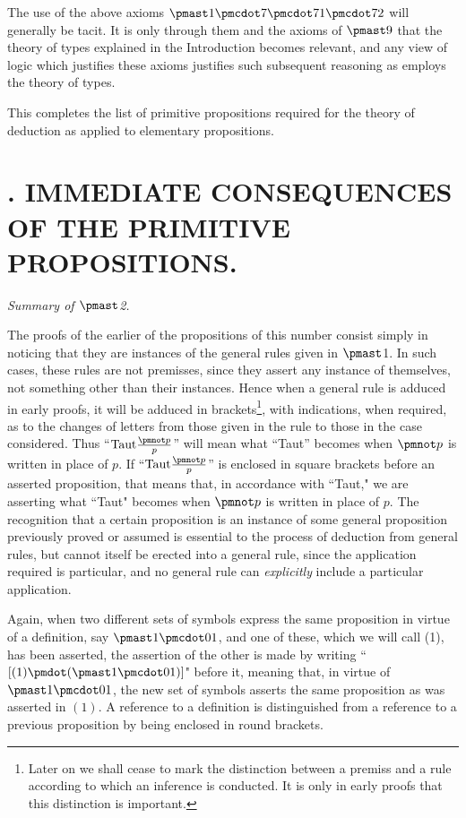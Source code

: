 \documentclass[letterpaper,12pt,openany,leqno]{book}
\newcommand{\pagefirst}[1]{\marginnote[\boxed{\text{#1}}]{\boxed{\text{#1}}}}
\begin{document}
The use of the above axioms $\pmast1\pmcdot7\pmcdot71\pmcdot72$ will generally be tacit. It is only through them and the axioms of $\pmast9$ that the theory of types explained in the Introduction becomes relevant, and any view of logic which justifies these axioms justifies such subsequent reasoning as employs the theory of types.

This completes the list of primitive propositions required for the theory of deduction as applied to elementary propositions.

\chapter*{\centering {}. IMMEDIATE CONSEQUENCES OF THE PRIMITIVE PROPOSITIONS.}  \pagefirst{102} \noindent
\indent \textit{Summary of $\pmast$2.}

The proofs of the earlier of the propositions of this number consist simply in noticing that they are instances of the general rules given in $\pmast$1. In such cases, these rules are not premisses, since they assert any instance of themselves, not something other than their instances. Hence when a general rule is adduced in early proofs, it will be adduced in brackets\footnote{Later on we shall cease to mark the distinction between a premiss and a rule according to which an inference is conducted. It is only in early proofs that this distinction is important.}, with indications, when required, as to the changes of letters from those given in the rule to those in the case considered. Thus ``$\text{Taut}\frac{\pmnot p}{p}$'' will mean what ``Taut'' becomes when $\pmnot p$ is written in place of $p$. If ``$\text{Taut}\frac{\pmnot p}{p}$'' is enclosed in square brackets before an asserted proposition, that means that, in accordance with ``Taut," we are asserting what ``Taut" becomes when $\pmnot p$ is written in place of $p$. The recognition that a certain proposition is an instance of some general proposition previously proved or assumed is essential to the process of deduction from general rules, but cannot itself be erected into a general rule, since the application required is particular, and no general rule can \textit{explicitly} include a particular application.

Again, when two different sets of symbols express the same proposition in virtue of a definition, say $\pmast1\pmcdot01$, and one of these, which we will call (1), has been asserted, the assertion of the other is made by writing ``$[(1)\pmdot(\pmast1\pmcdot01)]$" before it, meaning that, in virtue of $\pmast1\pmcdot01$, the new set of symbols asserts the same proposition as was asserted in $(1)$. A reference to a definition is distinguished from a reference to a previous proposition by being enclosed in round brackets.
\end{document}
